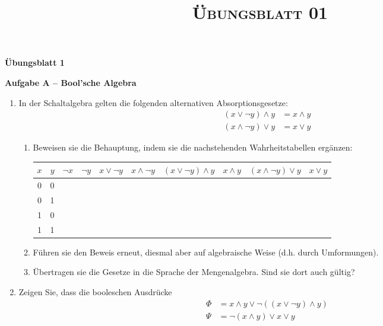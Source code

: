 \documentclass[paper=a4,fontsize=11pt]{scrartcl}%
\title{	
\normalfont \normalsize 
\textsc{Übungsblatt 01}
}
\numberwithin{equation}{section}
\begin{document}
\vspace*{-1cm}
\begin{center}
\Large{\textbf{Übungsblatt 1}}
\end{center}
\vspace*{-1cm}
\begin{center}\Large{\textbf{Aufgabe A -- Bool'sche Algebra}}\end{center}
\vspace*{-.8cm}
\begin{enumerate}
	\item In der Schaltalgebra gelten die folgenden alternativen Absorptionsgesetze:
	\begin{align*}
		(x \lor \neg y) \land y &= x \land y\\
		(x \land \neg y) \lor y &= x \lor y
	\end{align*}
	\begin{enumerate}
		\item Beweisen sie die Behauptung, indem sie die nachstehenden Wahrheitstabellen ergänzen:
	\begin{center}
	\begin{table}[ht]
	\centering
\begin{tabular}{|c|c|c|c|c|c|c|c|c|c|}
\hline
 $x$ & $y$ & $\neg x$ & $\neg y$ & $x \lor \neg y$ & $x \land \neg y$ & $(x \lor \neg y) \land y$ & $x \land y$ & $(x \land \neg y) \lor y$ & $x \lor y$ \\ \hline
0 & 0 &  &  &  &  &  &  &  &  \\ \hline
0 & 1 &  &  &  &  &  &  &  &  \\ \hline
1 & 0 &  &  &  &  &  &  &  &  \\ \hline
1 & 1 &  &  &  &  &  &  &  &  \\ \hline
\end{tabular}
\end{table}
	\end{center}
		\item Führen sie den Beweis erneut, diesmal aber auf algebraische Weise (d.h. durch Umformungen).
		\item Übertragen sie die Gesetze in die Sprache der Mengenalgebra. Sind sie dort auch gültig?
		\end{enumerate}
	\item Zeigen Sie, dass die booleschen Ausdrücke
	\begin{align*}
		\Phi &= x \land y  \lor \neg ((x \lor \neg y) \land y)\\
		\Psi &= \neg (x \land y) \lor x \lor y
	\end{align*}

\end{enumerate}
\end{document}
